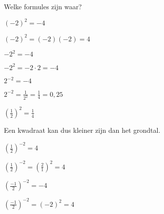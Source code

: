 \documentclass{ximera}
\begin{document}
\begin{exercise} Welke formules zijn waar?

    \begin{xmmulticols}[3]
    \begin{question} 
        \choiceFalse $\left(-2\right)^2 = -4$
        \begin{feedback} $(-2)^2 = (-2)(-2) = 4$ \end{feedback}
    \end{question}
    \begin{question} 
        \choiceTrue $-2^2 = -4$
        \begin{feedback} $-2^2 = - 2\cdot 2 = - 4 $ \end{feedback}
    \end{question}
    \begin{question} 
        \choiceFalse $2^{-2} = -4$
        \begin{feedback} $2^{-2} = \frac{1}{2^2} = \frac{1}{4} = 0,25$ \end{feedback}
    \end{question}
    
    \begin{question} 
        \choiceTrue $\left(\frac{1}{2}\right)^2 = \frac{1}{4}$
        \begin{feedback} Een kwadraat kan dus kleiner zijn dan het grondtal.\end{feedback}
    \end{question}
    \begin{question} 
        \choiceTrue $\left(\frac{1}{2}\right)^{-2} = 4$
        \begin{feedback} $ \left(\frac{1}{2}\right)^{-2} = \left(\frac{2}{1}\right)^{2} = 4$ \end{feedback}
    \end{question}
    \begin{question} 
        \choiceFalse $\left(\frac{-1}{2}\right)^{-2} = -4$
        \begin{feedback} $\left(\frac{-1}{2}\right)^{-2} = (-2)^2 = 4$\end{feedback}
    \end{question}
    \end{xmmulticols}

\end{exercise}
\end{document}

